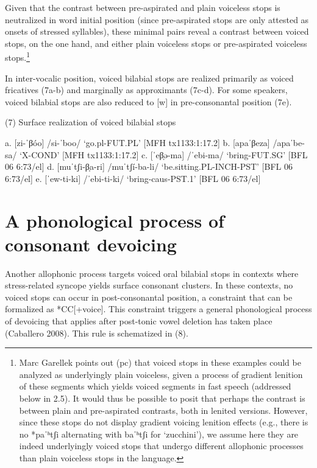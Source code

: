 Given that the contrast between pre-aspirated and plain voiceless stops is neutralized in word initial position (since pre-aspirated stops are only attested as onsets of stressed syllables), these minimal pairs reveal a contrast between voiced stops, on the one hand, and either plain voiceless stops or pre-aspirated voiceless stops.\footnote{Marc Garellek points out (pc) that voiced stops in these examples could be analyzed as underlyingly plain voiceless, given a process of gradient lenition of these segments which yields voiced segments in fast speech (addressed below in 2.5). It would thus be possible to posit that perhaps the contrast is between plain and pre-aspirated contrasts, both in lenited versions. However, since these stops do not display gradient voicing lenition effects (e.g., there is no *paˈʰtʃi alternating with baˈʰtʃi for ‘zucchini’), we assume here they are indeed underlyingly voiced stops that undergo different allophonic processes than plain voiceless stops in the language.}

In inter-vocalic position, voiced bilabial stops are realized primarily as voiced fricatives (7a-b) and marginally as approximants (7c-d). For some speakers, voiced bilabial stops are also reduced to [w] in pre-consonantal position (7e).

(7)	Surface realization of voiced bilabial stops

a.	[zi-ˈβóo]		/si-ˈboo/	‘go.pl-FUT.PL’					[MFH tx1133:1:17.2]
b.	[apaˈβeza]		/apaˈbe-sa/	‘X-COND’					[MFH tx1133:1:17.2]
c.	[ˈeβ̩ə-ma]		/ˈebi-ma/	‘bring-FUT.SG’	   				[BFL 06 6:73/el]
d.	[muˈtʃi-β̩a-ri]	/muˈtʃí-ba-li/	‘be.sitting.PL-INCH-PST’   			[BFL 06 6:73/el]
e.	[ˈew-ti-ki] 		/ˈebi-ti-ki/ 	‘bring-caus-PST.1’ 				[BFL 06 6:73/el]



\section{A phonological process of consonant devoicing}
\label{sec: a phonological process of consonant devoicing}

Another allophonic process targets voiced oral bilabial stops in contexts where stress-related syncope yields surface consonant clusters. In these contexts, no voiced stops can occur in post-consonantal position, a constraint that can be formalized as *CC[+voice]. This constraint triggers a general phonological process of devoicing that applies after post-tonic vowel deletion has taken place (Caballero 2008). This rule is schematized in (8).

